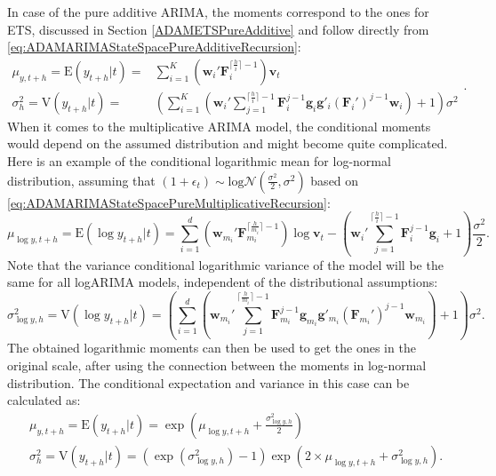 \documentclass[]{book}
\theoremstyle{definition}
\theoremstyle{definition}
\theoremstyle{definition}
\theoremstyle{definition}
\theoremstyle{remark}
\begin{document}
In case of the pure additive ARIMA, the moments correspond to the ones for ETS, discussed in Section \ref{ADAMETSPureAdditive} and follow directly from \eqref{eq:ADAMARIMAStateSpacePureAdditiveRecursion}:
\begin{equation*}
  \begin{aligned}
    \mu_{y,t+h} = \mathrm{E}(y_{t+h}|t) = & \sum_{i=1}^K \left(\mathbf{w}_{i}' \mathbf{F}_{i}^{\lceil\frac{h}{i}\rceil-1} \right) \mathbf{v}_{t} \\
    \sigma^2_{h} = \mathrm{V}(y_{t+h}|t) = & \left( \sum_{i=1}^K \left(\mathbf{w}_{i}' \sum_{j=1}^{\lceil\frac{h}{i}\rceil-1} \mathbf{F}_{i}^{j-1} \mathbf{g}_{i} \mathbf{g}'_{i} (\mathbf{F}_{i}')^{j-1} \mathbf{w}_{i} \right) + 1 \right) \sigma^2
  \end{aligned} .
\end{equation*}
When it comes to the multiplicative ARIMA model, the conditional moments would depend on the assumed distribution and might become quite complicated. Here is an example of the conditional logarithmic mean for log-normal distribution, assuming that \((1+\epsilon_t) \sim \mathrm{log}\mathcal{N}\left(\frac{\sigma^2}{2},\sigma^2 \right)\) based on \eqref{eq:ADAMARIMAStateSpacePureMultiplicativeRecursion}:
\begin{equation}
    \mu_{\log y,t+h} = \mathrm{E}(\log y_{t+h}|t) = \sum_{i=1}^d \left(\mathbf{w}_{m_i}' \mathbf{F}_{m_i}^{\lceil\frac{h}{m_i}\rceil-1} \right) \log \mathbf{v}_{t} -\left(\mathbf{w}_{i}' \sum_{j=1}^{\lceil\frac{h}{i}\rceil-1} \mathbf{F}_{i}^{j-1} \mathbf{g}_{i} + 1\right) \frac{\sigma^2}{2} .
  \label{eq:ADAMARIMAMultiplicativeMeanLogN}
\end{equation}
Note that the variance conditional logarithmic variance of the model will be the same for all logARIMA models, independent of the distributional assumptions:
\begin{equation}
    \sigma^2_{\log y,h} = \mathrm{V}(\log y_{t+h}|t) = \left( \sum_{i=1}^d \left(\mathbf{w}_{m_i}' \sum_{j=1}^{\lceil\frac{h}{m_i}\rceil-1} \mathbf{F}_{m_i}^{j-1} \mathbf{g}_{m_i} \mathbf{g}'_{m_i} (\mathbf{F}_{m_i}')^{j-1} \mathbf{w}_{m_i} \right) + 1 \right) \sigma^2 .
  \label{eq:ADAMARIMAMultiplicativeVarianceLogN}
\end{equation}
The obtained logarithmic moments can then be used to get the ones in the original scale, after using the connection between the moments in log-normal distribution. The conditional expectation and variance in this case can be calculated as:
\begin{equation}
  \begin{aligned}
    & \mu_{y,t+h} = \mathrm{E}(y_{t+h}|t) = \exp \left(\mu_{\log y,t+h} + \frac{\sigma^2_{\log y,h}}{2} \right) \\
    & \sigma^2_{h} = \mathrm{V}(y_{t+h}|t) = \left(\exp\left( \sigma^2_{\log y,h} \right) -1 \right)\exp\left(2 \times \mu_{\log y,t+h} + \sigma^2_{\log y,h} \right) .
  \end{aligned}
  \label{eq:ADAMARIMAMultiplicativeMomentsLogN}
\end{equation}
\end{document}
